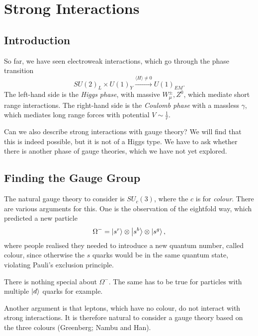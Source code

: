 
\chapter{Strong Interactions}%
\label{cha:strong_interactions}

\section{Introduction}%
\label{sec:introduction}

So far, we have seen electroweak interactions, which go through the phase transition
\begin{equation}
  SU(2)_L \times U(1)_Y \xrightarrow{\langle H \rangle \neq 0 } U(1)_{EM}.
\end{equation}
The left-hand side is the \emph{Higgs phase}, with massive $W^{\pm}_\mu, Z^0$, which mediate short range interactions.
The right-hand side is the \emph{Coulomb phase} with a massless $\gamma$, which mediates long range forces with potential $V \sim \frac{1}{r}$.

Can we also describe strong interactions with gauge theory?
We will find that this is indeed possible, but it is not of a Higgs type.
We have to ask whether there is another phase of gauge theories, which we have not yet explored.

\section{Finding the Gauge Group}%
\label{sec:finding_the_gauge_group}

The natural gauge theory to consider is $SU_c(3)$, where the $c$ is for \emph{colour}.
There are various arguments for this.
One is the observation of the eightfold way, which predicted a new particle
\begin{equation}
  \Omega^- = \ket{s^r} \otimes \ket{s^b} \otimes \ket{s^g},
\end{equation}
where people realised they needed to introduce a new quantum number, called colour, since otherwise the $s$ quarks would be in the same quantum state, violating Pauli's exclusion principle.
\begin{remark}
  There is nothing special about $\Omega^-$. The same has to be true for particles with multiple $\ket{d}$ quarks for example.
\end{remark}
Another argument is that leptons, which have no colour, do not interact with strong interactions.
It is therefore natural to consider a gauge theory based on the three colours (Greenberg; Nambu and Han).


